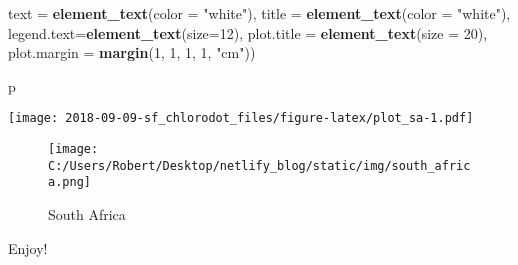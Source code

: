\documentclass[]{article}
\newenvironment{Shaded}{\begin{snugshade}}{\end{snugshade}}
\newcommand{\KeywordTok}[1]{\textcolor[rgb]{0.13,0.29,0.53}{\textbf{#1}}}
\newcommand{\DataTypeTok}[1]{\textcolor[rgb]{0.13,0.29,0.53}{#1}}
\newcommand{\DecValTok}[1]{\textcolor[rgb]{0.00,0.00,0.81}{#1}}
\newcommand{\StringTok}[1]{\textcolor[rgb]{0.31,0.60,0.02}{#1}}
\newcommand{\NormalTok}[1]{#1}
\begin{document}
\begin{Shaded}
\begin{Highlighting}[]
        \DataTypeTok{text =}  \KeywordTok{element_text}\NormalTok{(}\DataTypeTok{color =} \StringTok{"white"}\NormalTok{),}
        \DataTypeTok{title =}  \KeywordTok{element_text}\NormalTok{(}\DataTypeTok{color =} \StringTok{"white"}\NormalTok{),}
        \DataTypeTok{legend.text=}\KeywordTok{element_text}\NormalTok{(}\DataTypeTok{size=}\DecValTok{12}\NormalTok{),}
        \DataTypeTok{plot.title =} \KeywordTok{element_text}\NormalTok{(}\DataTypeTok{size =} \DecValTok{20}\NormalTok{),}
        \DataTypeTok{plot.margin =} \KeywordTok{margin}\NormalTok{(}\DecValTok{1}\NormalTok{, }\DecValTok{1}\NormalTok{, }\DecValTok{1}\NormalTok{, }\DecValTok{1}\NormalTok{, }\StringTok{"cm"}\NormalTok{))}

\NormalTok{p}
\end{Highlighting}
\end{Shaded}

\texttt{[image: 2018-09-09-sf\_chlorodot\_files/figure-latex/plot\_sa-1.pdf]}

\begin{figure}
\centering
\texttt{[image: C:/Users/Robert/Desktop/netlify\_blog/static/img/south\_africa.png]}
\caption{South Africa}
\end{figure}

Enjoy!
\end{document}
